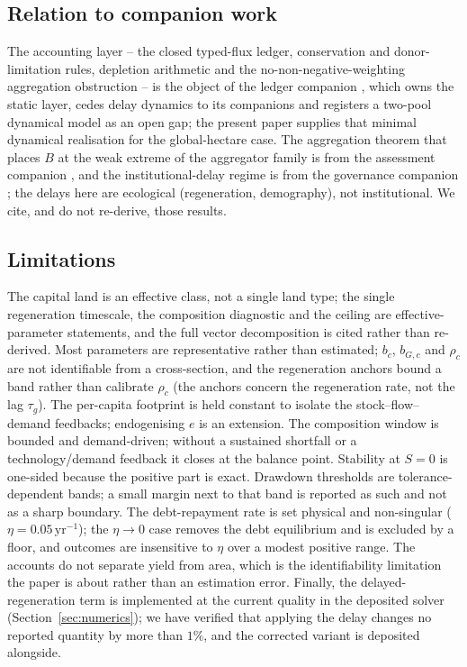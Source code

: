 \documentclass[preprint,12pt,authoryear]{elsarticle}
\begin{document}
\subsection{Relation to companion work}

The accounting layer -- the closed typed-flux ledger, conservation and donor-limitation rules, depletion arithmetic and the no-non-negative-weighting aggregation obstruction -- is the object of the ledger companion \citep{Abaee2026c}, which owns the static layer, cedes delay dynamics to its companions and registers a two-pool dynamical model as an open gap; the present paper supplies that minimal dynamical realisation for the global-hectare case. The aggregation theorem that places $B$ at the weak extreme of the aggregator family is from the assessment companion \citep{Abaee2026b}, and the institutional-delay regime is from the governance companion \citep{Abaee2026a}; the delays here are ecological (regeneration, demography), not institutional. We cite, and do not re-derive, those results.

\subsection{Limitations}

The capital land is an effective class, not a single land type; the single regeneration timescale, the composition diagnostic and the ceiling are effective-parameter statements, and the full vector decomposition is cited rather than re-derived. Most parameters are representative rather than estimated; $b_c$, $b_{G,c}$ and $\rho_c$ are not identifiable from a cross-section, and the regeneration anchors bound a band rather than calibrate $\rho_c$ (the anchors concern the regeneration rate, not the lag $\tau_g$). The per-capita footprint is held constant to isolate the stock--flow--demand feedbacks; endogenising $e$ is an extension. The composition window is bounded and demand-driven; without a sustained shortfall or a technology/demand feedback it closes at the balance point. Stability at $S=0$ is one-sided because the positive part is exact. Drawdown thresholds are tolerance-dependent bands; a small margin next to that band is reported as such and not as a sharp boundary. The debt-repayment rate is set physical and non-singular ($\eta=0.05\,\mathrm{yr}^{-1}$); the $\eta\to0$ case removes the debt equilibrium and is excluded by a floor, and outcomes are insensitive to $\eta$ over a modest positive range. The accounts do not separate yield from area, which is the identifiability limitation the paper is about rather than an estimation error. Finally, the delayed-regeneration term is implemented at the current quality in the deposited solver (Section~\ref{sec:numerics}); we have verified that applying the delay changes no reported quantity by more than $1\%$, and the corrected variant is deposited alongside.
\end{document}
